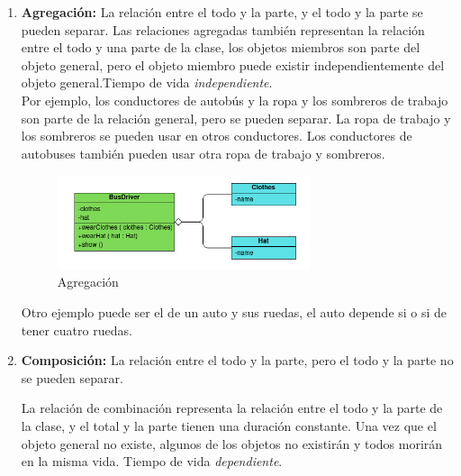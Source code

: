 \documentclass[../main.tex]{subfiles}
\begin{document}
\begin{enumerate}
                \begin{enumerate}
                    \item \textbf{Agregación:} 
                        La relación entre el todo y la parte, y el todo y la parte se pueden separar.
                        Las relaciones agregadas también representan la relación entre el todo y una parte de la clase, los objetos miembros son parte del objeto general, pero el objeto miembro puede existir independientemente del objeto general.Tiempo de vida \textit{independiente}.\\

                        Por ejemplo, los conductores de autobús y la ropa y los sombreros de trabajo son parte de la relación general, pero se pueden separar. La ropa de trabajo y los sombreros se pueden usar en otros conductores. Los conductores de autobuses también pueden usar otra ropa de trabajo y sombreros.

                        \begin{figure}[ht]
                            \centering
                            \includegraphics[width=0.7\textwidth]{../images/uml_agregacion.png}
                            \caption{Agregación}
                            \label{fig:uml_agregacion}
                        \end{figure}

                        Otro ejemplo puede ser el de un auto y sus ruedas, el auto depende si o si de tener cuatro ruedas.

                    \item \textbf{Composición:} 
                        La relación entre el todo y la parte, pero el todo y la parte no se pueden separar.
                        
                        La relación de combinación representa la relación entre el todo y la parte de la clase, y el total y la parte tienen una duración constante. Una vez que el objeto general no existe, algunos de los objetos no existirán y todos morirán en la misma vida. Tiempo de vida \textit{dependiente}.\\ 
                        

\end{enumerate}
\end{enumerate}
\end{document}
